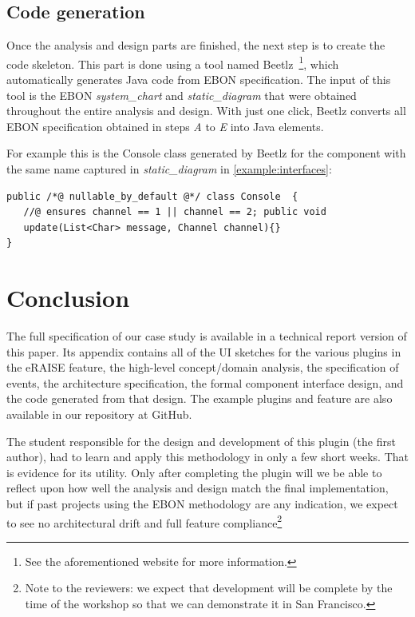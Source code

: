 \documentclass[conference]{IEEEtran}
\newcommand{\note}[1]{\todo[inline,color=red!40]{#1}}
\begin{document}
%
\subsection{Code generation}
\label{sec:code-generation}

Once the analysis and design parts are finished, the next step is to
create the code skeleton. This part is done using a tool named
Beetlz~\footnote{See the aforementioned website for more
  information.}, which automatically generates Java code from EBON
specification. The input of this tool is the EBON \emph{system\_chart}
and \emph{static\_diagram} that were obtained throughout the entire
analysis and design. With just one click, Beetlz converts all EBON
specification obtained in steps \emph{A} to \emph{E} into Java
elements.


For example this is the Console class generated by Beetlz for the
component with the same name captured in \emph{static\_diagram} in
\autoref{example:interfaces}:

\begin{lstlisting}
public /*@ nullable_by_default @*/ class Console  {
   //@ ensures channel == 1 || channel == 2; public void
   update(List<Char> message, Channel channel){}
}
\end{lstlisting}

\section{Conclusion}
\label{sec:conclusion}

The full specification of our case study is available in a technical
report version of this paper.  Its appendix contains all of the UI
sketches for the various plugins in the eRAISE feature, the high-level
concept/domain analysis, the specification of events, the architecture
specification, the formal component interface design, and the code
generated from that design.  The example plugins and feature are also
available in our repository at GitHub.

The student responsible for the design and development of this plugin
(the first author), had to learn and apply this methodology in only a
few short weeks.  That is evidence for its utility.  Only after
completing the plugin will we be able to reflect upon how well the
analysis and design match the final implementation, but if past
projects using the EBON methodology are any indication, we expect to
see no architectural drift and full feature compliance\footnote{Note
  to the reviewers: we expect that development will be complete by the
  time of the workshop so that we can demonstrate it in San Francisco.}
\end{document}
